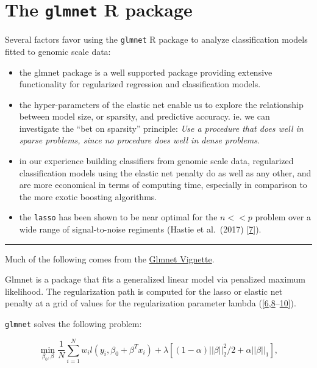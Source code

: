 \documentclass[
]{book}
\begin{document}
\hypertarget{the-glmnet-r-package}{%
\section{\texorpdfstring{The \texttt{glmnet} R package}{The glmnet R package}}\label{the-glmnet-r-package}}

Several factors favor using the \texttt{glmnet} R package to analyze
classification models fitted to genomic scale data:

\begin{itemize}
\item
  the glmnet package is a well supported package providing
  extensive functionality for regularized regression and classification models.
\item
  the hyper-parameters of the elastic net enable us to explore
  the relationship between model size, or sparsity, and predictive accuracy.
  ie. we can investigate the ``bet on sparsity'' principle:
  \emph{Use a procedure that does well in sparse problems, since no procedure
  does well in dense problems}.
\item
  in our experience building classifiers from genomic scale data, regularized
  classification models using the elastic net penalty do as well as any other,
  and are more economical in terms of computing time, especially in comparison to
  the more exotic boosting algorithms.
\item
  the \texttt{lasso} has been shown to be near optimal for the \(n<<p\) problem
  over a wide range of signal-to-noise regiments (Hastie et al.~(2017) {[}\protect\hyperlink{ref-Hastie:2017aa}{7}{]}).
\end{itemize}

\begin{center}\rule{0.5\linewidth}{0.5pt}\end{center}

Much of the following comes from the
\href{https://web.stanford.edu/~hastie/glmnet/glmnet_alpha.html}{Glmnet Vignette}.

Glmnet is a package that fits a generalized linear model via penalized maximum likelihood.
The regularization path is computed for the lasso or elastic net penalty at a
grid of values for the regularization parameter lambda
({[}\protect\hyperlink{ref-Friedman:2010aa}{6},\protect\hyperlink{ref-Tibshirani:2012aa}{8}--\protect\hyperlink{ref-Simon:2013aa}{10}{]}).

\texttt{glmnet} solves the following problem:

\[\min_{\beta_0,\beta} \frac{1}{N} \sum_{i=1}^{N} w_i l(y_i,\beta_0+\beta^T x_i) + \lambda\left[(1-\alpha)||\beta||_2^2/2 + \alpha ||\beta||_1\right],\]
\end{document}

